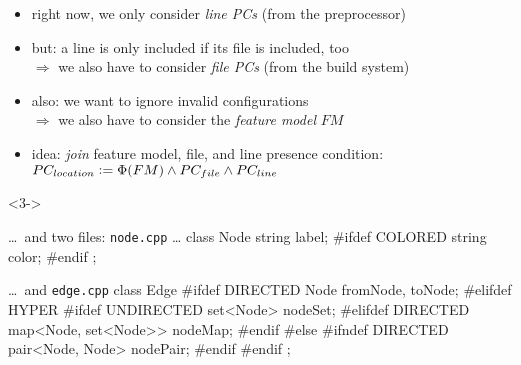 \begin{frame}[fragile]{\myframetitle}
	\begin{mycolumns}[widths={67,33},animation=none]
		\begin{note}{}
			\begin{itemize}
				\item right now, we only consider \emph{line PCs} (from the preprocessor)
				\item but: a line is only included if its file is included, too\\
					$\Rightarrow$ we also have to consider \emph{file PCs} (from the build system)
				\item also: we want to ignore invalid configurations\\
					$\Rightarrow$ we also have to consider the \emph{feature model} $FM$
				\item idea: \emph{join} feature model, file, and line presence condition:\\
					$PC_{location} \vcentcolon= \Phi(FM) \wedge PC_{file} \wedge PC_{line}$
			\end{itemize}
		\end{note}
	\mynextcolumn
		\begin{uncoverenv}<3->
			\begin{cpptight}[basicstyle=\tiny]{\ldots\ and two files: \texttt{node.cpp} \ldots}
class Node {
	string label;
#ifdef COLORED
	string color;
#endif
};
			\end{cpptight}
			\begin{cpptight}[basicstyle=\tiny]{\ldots\ and \texttt{edge.cpp}}
class Edge {
#ifdef DIRECTED
	Node fromNode, toNode;
#elifdef HYPER
#ifdef UNDIRECTED
	set<Node> nodeSet;
#elifdef DIRECTED
	map<Node, set<Node>> nodeMap;
#endif
#else
#ifndef DIRECTED
	pair<Node, Node> nodePair;
#endif
#endif
};
			\end{cpptight}
		\end{uncoverenv}
	\end{mycolumns}
\end{frame}

